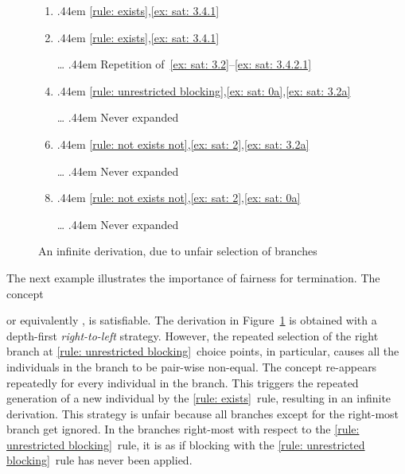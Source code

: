 \documentclass[leqno
,pdflatex
,prodmode
,acmtocl
]{acmsmall}
\makeatletter
\def\tfillsymbol{\mbox{\fontsize{3}{4}\selectfont.}}
\def\tfill{\leavevmode
  \cleaders \hb@xt@ .44em{\hss{\tfillsymbol}\hss}\hfill
  \kern\z@}
\newcommand{\titem}[2]{\tfill #2}
\newcommand{\tbranch}{{\blacktriangleright}}
\newcommand{\indiv}{a}
\newcommand{\cname}{A}
\newcommand{\rname}{Q}
\renewcommand{\tbranch}{{\qquad\blacktriangleright}}
\makeatother
\begin{document}
\begin{figure}[tbu]
\begin{center}
\begin{minipage}{.725\textwidth}
\begin{enumerate}[1.]
  \item\label{ex: sat: 3.4.2.0}\titem{\tskip[3]\indiv_2:\cname}{\eqref{rule: exists},\ref{ex: sat: 3.4.1}}
  \item\label{ex: sat: 3.4.2.1}\titem{\tskip[3]\indiv_1:\exists \rname.\{\indiv_2\}}{\eqref{rule: exists},\ref{ex: sat: 3.4.1}}
  \item[\ldots]\label{ex: sat: 3.4.2.2}
    \titem{\tskip[3]\textbf{Non-terminating}}{Repetition of~\ref{ex: sat: 3.2}--\ref{ex: sat: 3.4.2.1}}
  \item\label{ex: sat: 3.4.3}\titem{\tskip[2]\tbranch\indiv_0:\{\indiv_1\}}{\eqref{rule: unrestricted blocking},\ref{ex: sat: 0a},\ref{ex: sat: 3.2a}}
  \item[\ldots]\label{ex: sat: 3.4.3.0}
    \titem{\tskip[3]}
    {Never expanded}
  \item\label{ex: sat: 3.5}\titem{\tskip\tbranch\indiv_0:\exists Q'.\{\indiv_1\}}{\eqref{rule: not exists not},\ref{ex: sat: 2},\ref{ex: sat: 3.2a}}
  \item[\ldots]\label{ex: sat: 3.5.0}
    \titem{\tskip[2]}
    {Never expanded}
  \item\label{ex: sat: 4}\titem{\tbranch\indiv_0:\exists Q'.\{\indiv_0\}}{\eqref{rule: not exists not},\ref{ex: sat: 2},\ref{ex: sat: 0a}}
  \item[\ldots]\label{ex: sat: 4.0}
    \titem{\tskip}
    {Never expanded}
 \end{enumerate}
\end{minipage}
\end{center}
\caption{An infinite derivation, due to unfair selection of branches}
\label{figure: unfair branch choice}
\end{figure}

The next example illustrates the importance of fairness for termination.
The concept

or equivalently 
,
is satisfiable.
The derivation in Figure~\ref{figure: unfair branch choice} is
obtained with a depth-first \emph{right-to-left} strategy.
However, the repeated selection of the right branch at 
\eqref{rule: unrestricted blocking}~choice points, in particular,
causes all the individuals in the branch to be pair-wise non-equal.
The concept  re-appears repeatedly
for every individual  in the branch.
This triggers the repeated generation of a new individual by the 
\eqref{rule: exists}~rule, resulting in an infinite
derivation.
This strategy is unfair because all branches except for the right-most
branch get ignored.
In the branches right-most with respect to the \eqref{rule: unrestricted blocking}~rule, it is as if blocking with the \eqref{rule: unrestricted blocking}~rule
has never been applied.
\end{document}
